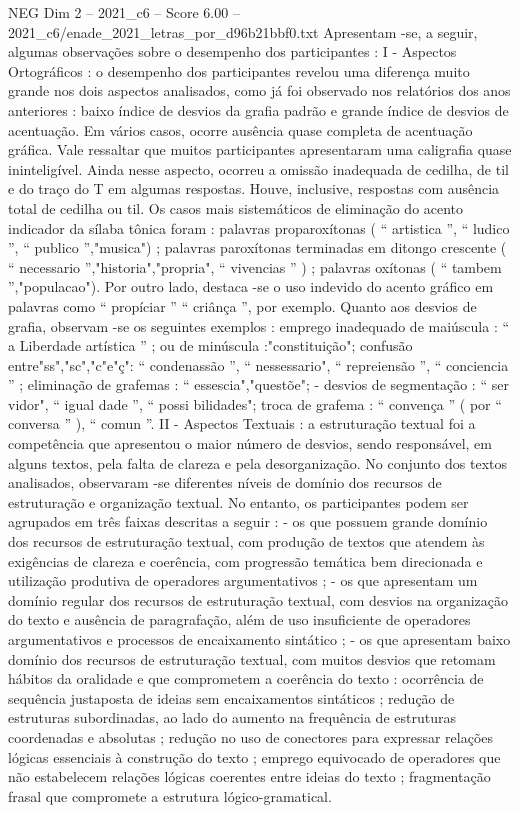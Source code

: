 \begin{textsample}{NEG Dim 2 – 2021\_c6 – Score 6.00 – 2021\_c6/enade\_2021\_letras\_por\_d96b21bbf0.txt}
Apresentam -se, a seguir, algumas observações sobre o desempenho dos participantes : I - Aspectos Ortográficos : o desempenho dos participantes revelou uma diferença muito grande nos dois aspectos analisados, como já foi observado nos relatórios dos anos anteriores : baixo índice de desvios da grafia padrão e grande índice de desvios de acentuação.
Em vários casos, ocorre ausência quase completa de acentuação gráfica.
Vale ressaltar que muitos participantes apresentaram uma caligrafia quase ininteligível.
Ainda nesse aspecto, ocorreu a omissão inadequada de cedilha, de til e do traço do T em algumas respostas.
Houve, inclusive, respostas com ausência total de cedilha ou til.
Os casos mais sistemáticos de eliminação do acento indicador da sílaba tônica foram : palavras proparoxítonas ( “ artistica ”, “ ludico ”, “ publico ”,"musica") ; palavras paroxítonas terminadas em ditongo crescente ( “ necessario ”,"historia","propria", “ vivencias ” ) ; palavras oxítonas ( “ tambem ”,"populacao").
Por outro lado, destaca -se o uso indevido do acento gráfico em palavras como “ propíciar ” “ criânça ”, por exemplo.
Quanto aos desvios de grafia, observam -se os seguintes exemplos : emprego inadequado de maiúscula : “ a Liberdade artística ” ; ou de minúscula :"constituição"; confusão entre"ss","sc","c"e"ç": “ condenassão ”, “ nessessario", “ repreiensão ”, “ conciencia ” ; eliminação de grafemas : “ essescia","questõe"; - desvios de segmentação : “ ser vidor", “ igual dade ”, “ possi bilidades"; troca de grafema : “ convença ” ( por “ conversa ” ), “ comun ”.
II - Aspectos Textuais : a estruturação textual foi a competência que apresentou o maior número de desvios, sendo responsável, em alguns textos, pela falta de clareza e pela desorganização.
No conjunto dos textos analisados, observaram -se diferentes níveis de domínio dos recursos de estruturação e organização textual.
No entanto, os participantes podem ser agrupados em três faixas descritas a seguir : - os que possuem grande domínio dos recursos de estruturação textual, com produção de textos que atendem às exigências de clareza e coerência, com progressão temática bem direcionada e utilização produtiva de operadores argumentativos ; - os que apresentam um domínio regular dos recursos de estruturação textual, com desvios na organização do texto e ausência de paragrafação, além de uso insuficiente de operadores argumentativos e processos de encaixamento sintático ; - os que apresentam baixo domínio dos recursos de estruturação textual, com muitos desvios que retomam hábitos da oralidade e que comprometem a coerência do texto : ocorrência de sequência justaposta de ideias sem encaixamentos sintáticos ; redução de estruturas subordinadas, ao lado do aumento na frequência de estruturas coordenadas e absolutas ; redução no uso de conectores para expressar relações lógicas essenciais à construção do texto ; emprego equivocado de operadores que não estabelecem relações lógicas coerentes entre ideias do texto ; fragmentação frasal que compromete a estrutura lógico-gramatical.

\end{textsample}
